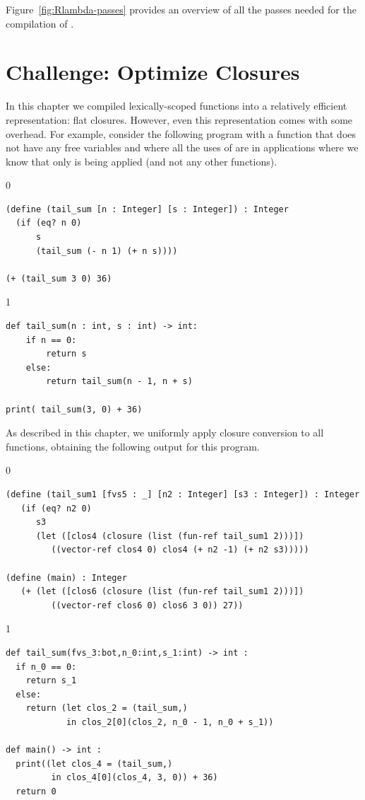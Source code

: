 \documentclass[7x10,nocrop]{TimesAPriori_MIT}%
\def\racketEd{0}
\def\pythonEd{1}
\def\edition{0}
\begin{document}
Figure~\ref{fig:Rlambda-passes} provides an overview of all the passes needed
for the compilation of \LangLam{}.

\clearpage

\section{Challenge: Optimize Closures}
\label{sec:optimize-closures}

In this chapter we compiled lexically-scoped functions into a
relatively efficient representation: flat closures. However, even this
representation comes with some overhead. For example, consider the
following program with a function  that does not have
any free variables and where all the uses of  are in
applications where we know that only  is being applied
(and not any other functions).
\begin{center}
\begin{minipage}{0.95\textwidth}
{\if\edition\racketEd  
\begin{lstlisting}
(define (tail_sum [n : Integer] [s : Integer]) : Integer
  (if (eq? n 0)
      s
      (tail_sum (- n 1) (+ n s))))

(+ (tail_sum 3 0) 36)
\end{lstlisting}
\fi}
{\if\edition\pythonEd
\begin{lstlisting}
def tail_sum(n : int, s : int) -> int:
    if n == 0:
        return s
    else:
        return tail_sum(n - 1, n + s)

print( tail_sum(3, 0) + 36)
\end{lstlisting}
\fi}
\end{minipage}
\end{center}
As described in this chapter, we uniformly apply closure conversion to
all functions, obtaining the following output for this program.
\begin{center}
\begin{minipage}{0.95\textwidth}
{\if\edition\racketEd  
\begin{lstlisting}
(define (tail_sum1 [fvs5 : _] [n2 : Integer] [s3 : Integer]) : Integer
   (if (eq? n2 0)
      s3
      (let ([clos4 (closure (list (fun-ref tail_sum1 2)))])
         ((vector-ref clos4 0) clos4 (+ n2 -1) (+ n2 s3)))))

(define (main) : Integer
   (+ (let ([clos6 (closure (list (fun-ref tail_sum1 2)))])
         ((vector-ref clos6 0) clos6 3 0)) 27))
\end{lstlisting}
\fi}
{\if\edition\pythonEd
\begin{lstlisting}
def tail_sum(fvs_3:bot,n_0:int,s_1:int) -> int :
  if n_0 == 0:
    return s_1
  else:
    return (let clos_2 = (tail_sum,)
            in clos_2[0](clos_2, n_0 - 1, n_0 + s_1))

def main() -> int :
  print((let clos_4 = (tail_sum,)
         in clos_4[0](clos_4, 3, 0)) + 36)
  return 0
\end{lstlisting}
\fi}
\end{minipage}
\end{center}
\end{document}
